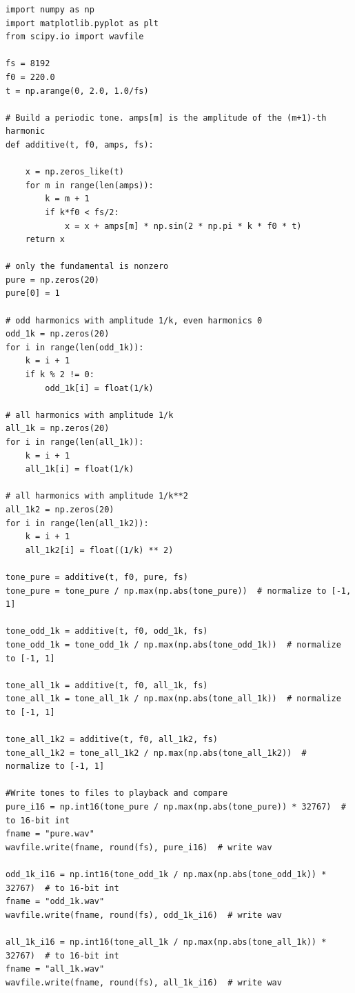 \documentclass[11pt, a4paper]{article}
\begin{document}
\begin{lstlisting}[style=python]
import numpy as np
import matplotlib.pyplot as plt
from scipy.io import wavfile

fs = 8192
f0 = 220.0
t = np.arange(0, 2.0, 1.0/fs)

# Build a periodic tone. amps[m] is the amplitude of the (m+1)-th harmonic
def additive(t, f0, amps, fs):

    x = np.zeros_like(t)
    for m in range(len(amps)):
        k = m + 1
        if k*f0 < fs/2:
            x = x + amps[m] * np.sin(2 * np.pi * k * f0 * t)
    return x

# only the fundamental is nonzero
pure = np.zeros(20)
pure[0] = 1

# odd harmonics with amplitude 1/k, even harmonics 0
odd_1k = np.zeros(20)
for i in range(len(odd_1k)):
    k = i + 1
    if k % 2 != 0:
        odd_1k[i] = float(1/k)

# all harmonics with amplitude 1/k 
all_1k = np.zeros(20)
for i in range(len(all_1k)):
    k = i + 1
    all_1k[i] = float(1/k)

# all harmonics with amplitude 1/k**2
all_1k2 = np.zeros(20)
for i in range(len(all_1k2)):
    k = i + 1
    all_1k2[i] = float((1/k) ** 2)

tone_pure = additive(t, f0, pure, fs) 
tone_pure = tone_pure / np.max(np.abs(tone_pure))  # normalize to [-1, 1]

tone_odd_1k = additive(t, f0, odd_1k, fs)
tone_odd_1k = tone_odd_1k / np.max(np.abs(tone_odd_1k))  # normalize to [-1, 1]

tone_all_1k = additive(t, f0, all_1k, fs)
tone_all_1k = tone_all_1k / np.max(np.abs(tone_all_1k))  # normalize to [-1, 1]

tone_all_1k2 = additive(t, f0, all_1k2, fs)
tone_all_1k2 = tone_all_1k2 / np.max(np.abs(tone_all_1k2))  # normalize to [-1, 1]

#Write tones to files to playback and compare
pure_i16 = np.int16(tone_pure / np.max(np.abs(tone_pure)) * 32767)  # to 16-bit int
fname = "pure.wav"
wavfile.write(fname, round(fs), pure_i16)  # write wav

odd_1k_i16 = np.int16(tone_odd_1k / np.max(np.abs(tone_odd_1k)) * 32767)  # to 16-bit int
fname = "odd_1k.wav"
wavfile.write(fname, round(fs), odd_1k_i16)  # write wav

all_1k_i16 = np.int16(tone_all_1k / np.max(np.abs(tone_all_1k)) * 32767)  # to 16-bit int
fname = "all_1k.wav"
wavfile.write(fname, round(fs), all_1k_i16)  # write wav


\end{lstlisting}
\end{document}
